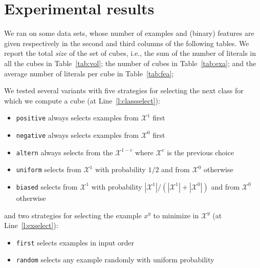 \documentclass{article}
\newcommand{\setex}[1]{\ensuremath{{\mathcal X}^{#1}}\xspace}
\newcommand{\posex}{{\setex{1}}\xspace}
\newcommand{\negex}{{\setex{0}}\xspace}
\newcommand{\var}{\ensuremath{x}}
\newcommand{\ex}{\ensuremath{\var}}
\begin{document}
\section*{Experimental results}

We ran \explain on some data sets, whose number of examples and (binary) features are given respectively in the second and third columns of the following tables. We report the total \emph{size} of the set of cubes, i.e., the sum of the number of literals in all the cubes in Table~\ref{tab:vol}; the number of cubes in Table~\ref{tab:exa}; and the average number of literals per cube in Table~\ref{tab:fea};

We tested several variants with five strategies for selecting the next class for which we compute a cube (at Line~\ref{l:classselect}):
\begin{itemize}
	\item \texttt{positive} always selects examples from $\posex$ first
		\item \texttt{negative} always selects examples from $\negex$ first
	\item \texttt{altern} always selects from the $\setex{1-c}$ where $\setex{c}$ is the previous choice
\item \texttt{uniform} selects from $\posex$ with probability $1/2$ and from $\negex$ otherwise
\item \texttt{biased} selects from $\posex$ with probability $|\posex|/(|\posex|+|\negex|)$ and from $\negex$ otherwise
\end{itemize}
and two strategies for selecting the example $\ex^y$ to minimize in $\setex{y}$ (at Line~\ref{l:exselect}):
\begin{itemize}
	\item \texttt{first} selects examples in input order
	\item \texttt{random} selects any example randomly with uniform probability
\end{itemize}

\end{document}
